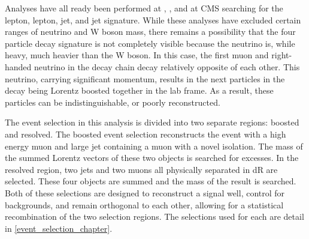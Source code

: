 Analyses have all ready been performed at \rootsseven, \rootseight, and \rootsthirteen at CMS searching for the lepton, lepton, jet, and jet signature.  While these analyses have excluded certain ranges of neutrino and W boson mass, there remains a possibility that the four particle decay signature is not completely visible because the neutrino is, while heavy, much heavier than the W boson.  In this case, the first muon and right-handed neutrino in the decay chain decay relatively opposite of each other.  This neutrino, carrying significant momentum, results in the next particles in the decay being Lorentz boosted together in the lab frame.  As a result, these particles can be indistinguishable, or poorly reconstructed.

The event selection in this analysis is divided into two separate regions: boosted and resolved. The boosted event selection reconstructs the event with a high energy muon and large jet containing a muon with a novel isolation.  The mass of the summed Lorentz vectors of these two objects is searched for excesses. In the resolved region, two jets and two muons all physically separated in dR are selected.  These four objects are summed and the mass of the result is searched. Both of these selections are designed to reconstruct a signal well, control for backgrounds, and remain orthogonal to each other, allowing for a statistical recombination of the two selection regions.  The selections used for each are detail in \ref{event_selection_chapter}.





